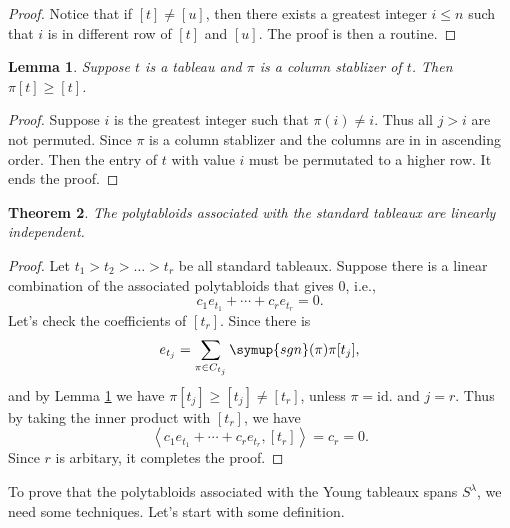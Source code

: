 \documentclass{assignment}[2019/10/15]
\newcommand{\lr}[3]{\left#1#3\right#2}
\theoremstyle{plain}
\newtheorem{theorem}{Theorem}[section]
\newtheorem{lemma}[theorem]{Lemma}
\newcommand{\sgn}{\mathop{}\!\symup{sgn}}
\newcommand{\id}{\text{id.}}
\begin{document}
    \begin{proof}
        Notice that if $[t]\neq [u]$, then there exists a greatest integer $i\leq n$ such that $i$ is in different row of $[t]$ and $[u]$. The proof is then a routine.
    \end{proof}

    \begin{lemma}\label{lem: leq}
        Suppose $t$ is a tableau and $\pi$ is a column stablizer of $t$. Then $\pi [t]\geq [t]$.
    \end{lemma}

    \begin{proof}
        Suppose $i$ is the greatest integer such that $\pi (i)\neq i$. Thus all $j>i$ are not permuted. Since $\pi$ is a column stablizer and the columns are in in ascending order. Then the entry of $t$ with value $i$ must be permutated to a higher row. It ends the proof.
    \end{proof}

    \begin{theorem}
        The polytabloids associated with the standard tableaux are linearly independent.
    \end{theorem}

    \begin{proof}
        Let $t_1> t_2 > \dotsc > t_r$ be all standard tableaux. Suppose there is a linear combination of the associated polytabloids that gives 0, i.e.,
        \begin{equation}
            c_1e_{t_1}+\dotsb + c_re_{t_r}=0.
        \end{equation}
        Let's check the coefficients of $[t_r]$. Since there is
        \begin{equation}
            e_{t_j} = \sum_{\pi\in C_{t_j}}\sgn(\pi)\pi[t_j],
        \end{equation}
        and by Lemma \ref{lem: leq} we have $\pi[t_j]\geq[t_j]\neq [t_r]$, unless $\pi=\id$ and $j=r$. Thus by taking the inner product with $[t_r]$, we have
        \begin{equation}
            \lr<>{c_1e_{t_1}+\dotsb + c_re_{t_r}, [t_r]} = c_r = 0.
        \end{equation}
        Since $r$ is arbitary, it completes the proof.
    \end{proof}

    To prove that the polytabloids associated with the Young tableaux spans $S^\lambda$, we need some techniques. Let's start with some definition.
\end{document}
